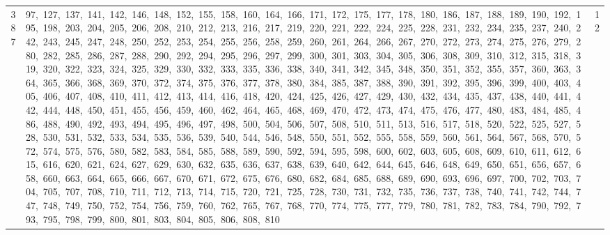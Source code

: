 \begin{longtable}{c|p{}|r}
387 & 97,\ 127,\ 137,\ 141,\ 142,\ 146,\ 148,\ 152,\ 155,\ 158,\ 160,\ 164,\ 166,\ 171,\ 172,\ 175,\ 177,\ 178,\ 180,\ 186,\ 187,\ 188,\ 189,\ 190,\ 192,\ 195,\ 198,\ 203,\ 204,\ 205,\ 206,\ 208,\ 210,\ 212,\ 213,\ 216,\ 217,\ 219,\ 220,\ 221,\ 222,\ 224,\ 225,\ 228,\ 231,\ 232,\ 234,\ 235,\ 237,\ 240,\ 242,\ 243,\ 245,\ 247,\ 248,\ 250,\ 252,\ 253,\ 254,\ 255,\ 256,\ 258,\ 259,\ 260,\ 261,\ 264,\ 266,\ 267,\ 270,\ 272,\ 273,\ 274,\ 275,\ 276,\ 279,\ 280,\ 282,\ 285,\ 286,\ 287,\ 288,\ 290,\ 292,\ 294,\ 295,\ 296,\ 297,\ 299,\ 300,\ 301,\ 303,\ 304,\ 305,\ 306,\ 308,\ 309,\ 310,\ 312,\ 315,\ 318,\ 319,\ 320,\ 322,\ 323,\ 324,\ 325,\ 329,\ 330,\ 332,\ 333,\ 335,\ 336,\ 338,\ 340,\ 341,\ 342,\ 345,\ 348,\ 350,\ 351,\ 352,\ 355,\ 357,\ 360,\ 363,\ 364,\ 365,\ 366,\ 368,\ 369,\ 370,\ 372,\ 374,\ 375,\ 376,\ 377,\ 378,\ 380,\ 384,\ 385,\ 387,\ 388,\ 390,\ 391,\ 392,\ 395,\ 396,\ 399,\ 400,\ 403,\ 405,\ 406,\ 407,\ 408,\ 410,\ 411,\ 412,\ 413,\ 414,\ 416,\ 418,\ 420,\ 424,\ 425,\ 426,\ 427,\ 429,\ 430,\ 432,\ 434,\ 435,\ 437,\ 438,\ 440,\ 441,\ 442,\ 444,\ 448,\ 450,\ 451,\ 455,\ 456,\ 459,\ 460,\ 462,\ 464,\ 465,\ 468,\ 469,\ 470,\ 472,\ 473,\ 474,\ 475,\ 476,\ 477,\ 480,\ 483,\ 484,\ 485,\ 486,\ 488,\ 490,\ 492,\ 493,\ 494,\ 495,\ 496,\ 497,\ 498,\ 500,\ 504,\ 506,\ 507,\ 508,\ 510,\ 511,\ 513,\ 516,\ 517,\ 518,\ 520,\ 522,\ 525,\ 527,\ 528,\ 530,\ 531,\ 532,\ 533,\ 534,\ 535,\ 536,\ 539,\ 540,\ 544,\ 546,\ 548,\ 550,\ 551,\ 552,\ 555,\ 558,\ 559,\ 560,\ 561,\ 564,\ 567,\ 568,\ 570,\ 572,\ 574,\ 575,\ 576,\ 580,\ 582,\ 583,\ 584,\ 585,\ 588,\ 589,\ 590,\ 592,\ 594,\ 595,\ 598,\ 600,\ 602,\ 603,\ 605,\ 608,\ 609,\ 610,\ 611,\ 612,\ 615,\ 616,\ 620,\ 621,\ 624,\ 627,\ 629,\ 630,\ 632,\ 635,\ 636,\ 637,\ 638,\ 639,\ 640,\ 642,\ 644,\ 645,\ 646,\ 648,\ 649,\ 650,\ 651,\ 656,\ 657,\ 658,\ 660,\ 663,\ 664,\ 665,\ 666,\ 667,\ 670,\ 671,\ 672,\ 675,\ 676,\ 680,\ 682,\ 684,\ 685,\ 688,\ 689,\ 690,\ 693,\ 696,\ 697,\ 700,\ 702,\ 703,\ 704,\ 705,\ 707,\ 708,\ 710,\ 711,\ 712,\ 713,\ 714,\ 715,\ 720,\ 721,\ 725,\ 728,\ 730,\ 731,\ 732,\ 735,\ 736,\ 737,\ 738,\ 740,\ 741,\ 742,\ 744,\ 747,\ 748,\ 749,\ 750,\ 752,\ 754,\ 756,\ 759,\ 760,\ 762,\ 765,\ 767,\ 768,\ 770,\ 774,\ 775,\ 777,\ 779,\ 780,\ 781,\ 782,\ 783,\ 784,\ 790,\ 792,\ 793,\ 795,\ 798,\ 799,\ 800,\ 801,\ 803,\ 804,\ 805,\ 806,\ 808,\ 810 & 12 \\

\end{longtable}

